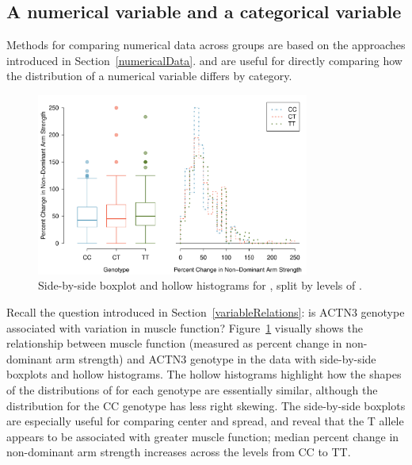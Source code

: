 \subsection{A numerical variable and a categorical variable}
\label{comparingAcrossGroups}

Methods for comparing numerical data across groups are based on the approaches introduced in Section~\ref{numericalData}.  and  are useful for directly comparing how the distribution of a numerical variable differs by category. 


\begin{figure}[h]
	\centering
	\includegraphics[width=0.8\textwidth]{ch_intro_to_data_oi_biostat/figures/famussGenoMuscFunc/famussGenoMuscFunc}
	\caption{Side-by-side boxplot and hollow histograms for , split by levels of .}
	\label{famussGenoMuscFunc}
\end{figure}

Recall the question introduced in Section~\ref{variableRelations}: is ACTN3 genotype associated with variation in muscle function? Figure~\ref{famussGenoMuscFunc} visually shows the relationship between muscle function (measured as percent change in non-dominant arm strength) and ACTN3 genotype in the  data with side-by-side boxplots and hollow histograms. The hollow histograms highlight how the shapes of the distributions of  for each genotype are essentially similar, although the distribution for the CC genotype has less right skewing. The side-by-side boxplots are especially useful for comparing center and spread, and reveal that the T allele appears to be associated with greater muscle function; median percent change in non-dominant arm strength increases across the levels from CC to TT. 

